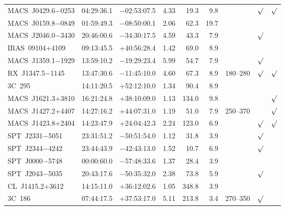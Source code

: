 \begin{table}
\begin{tabular}{lcccrrccc}
    MACS~J0429.6$-$0253  &  04:29:36.1  &  $-$02:53:07.5  &  4.33          &  19.3   &  9.8   &  ~          & $\surd$ & $\surd$ \\
    MACS~J0159.8$-$0849  &  01:59:49.3  &  $-$08:50:00.1  &  2.06          &  62.3   &  19.7  &  ~          &         &         \\
    MACS~J2046.0$-$3430  &  20:46:00.6  &  $-$34:30:17.5  &  4.59          &  43.3   &  7.9   &  ~          & $\surd$ &         \\
    IRAS~09104+4109      &  09:13:45.5  &  +40:56:28.4    &  1.42          &  69.0   &  8.9   &  ~          &         &         \\
    MACS~J1359.1$-$1929  &  13:59:10.2  &  $-$19:29:23.4  &  5.99          &  54.7   &  7.9   &  ~          & $\surd$ &         \\
    RX~J1347.5$-$1145    &  13:47:30.6  &  $-$11:45:10.0  &  4.60          &  67.3   &  8.9   &  180--280   & $\surd$ & $\surd$ \\
    3C~295               &  14:11:20.5  &  +52:12:10.0    &  1.34          &  90.4   &  8.9   &  ~          &         &         \\
    MACS~J1621.3+3810    &  16:21:24.8  &  +38:10:09.0    &  1.13          &  134.0  &  9.8   &  ~          &         & $\surd$ \\
    MACS~J1427.2+4407    &  14:27:16.2  &  +44:07:31.0    &  1.19          &  51.0   &  7.9   &  250--370   &         & $\surd$ \\
    MACS~J1423.8+2404    &  14:23:47.9  &  +24:04:42.3    &  2.24          &  123.0  &  6.9   &  ~          & $\surd$ & $\surd$ \\
    SPT~J2331$-$5051     &  23:31:51.2  &  $-$50:51:54.0  &  1.12          &  31.8   &  3.9   &  ~          & $\surd$ &         \\
    SPT~J2344$-$4242     &  23:44:43.9  &  $-$42:43:13.0  &  1.52          &  10.7   &  6.9   &  ~          & $\surd$ &         \\
    SPT~J0000$-$5748     &  00:00:60.0  &  $-$57:48:33.6  &  1.37          &  28.4   &  3.9   &  ~          &         &         \\
    SPT~J2043$-$5035     &  20:43:17.6  &  $-$50:35:32.0  &  2.38          &  73.8   &  5.9   &  ~          & $\surd$ &         \\
    CL~J1415.2+3612      &  14:15:11.0  &  +36:12:02.6    &  1.05          &  348.8  &  3.9   &  ~          &         &         \\
    3C~186               &  07:44:17.5  &  +37:53:17.0    &  5.11          &  213.8  &  3.4   &  270--350   & $\surd$ &         \\
  \end{tabular}
  \label{tab:targets}
\end{table}
